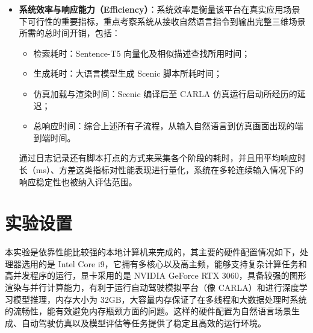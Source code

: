 \begin{itemize}
	\item \textbf{系统效率与响应能力（Efficiency）}：系统效率是衡量该平台在真实应用场景下可行性的重要指标，重点考察系统从接收自然语言指令到输出完整三维场景所需的总时间开销，包括：
	\begin{itemize}
		\item 检索耗时：Sentence-T5 向量化及相似描述查找所用时间；
		\item 生成耗时：大语言模型生成 Scenic 脚本所耗时间；
		\item 仿真加载与渲染时间：Scenic 编译后至 CARLA 仿真运行启动所经历的延迟；
		\item 总响应时间：综合上述所有子流程，从输入自然语言到仿真画面出现的端到端时间。
	\end{itemize}
通过日志记录还有脚本打点的方式来采集各个阶段的耗时，并且用平均响应时长（ms）、方差这类指标对性能表现进行量化，系统在多轮连续输入情况下的响应稳定性也被纳入评估范围。
\end{itemize}




	
\section{实验设置}


本实验是依靠性能比较强的本地计算机来完成的，其主要的硬件配置情况如下，处理器选用的是 Intel Core i9，它拥有多核心以及高主频，能够支持复杂计算任务和高并发程序的运行，显卡采用的是 NVIDIA GeForce RTX 3060，具备较强的图形渲染与并行计算能力，有利于运行自动驾驶模拟平台（像 CARLA）和进行深度学习模型推理，内存大小为 32GB，大容量内存保证了在多线程和大数据处理时系统的流畅性，能有效避免内存瓶颈方面的问题。这样的硬件配置为自然语言场景生成、自动驾驶仿真以及模型评估等任务提供了稳定且高效的运行环境。

\vspace{10pt} %

